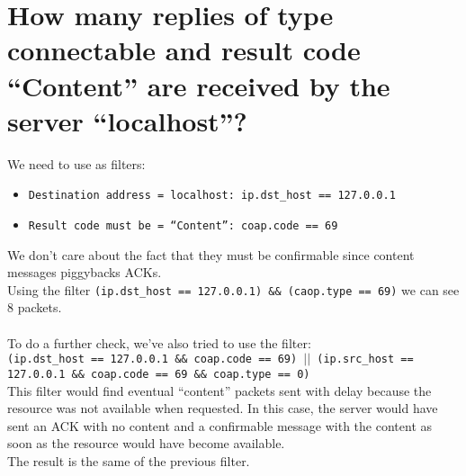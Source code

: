 \documentclass{article} %
\begin{document}
\section{\large{How many replies of type connectable and result code “Content” are received by the server “localhost”?}}
    We need to use as filters:
    \begin{itemize}
        \item \texttt{Destination address = localhost: ip.dst\_host == 127.0.0.1}
        \item \texttt{Result code must be = “Content”: coap.code == 69}
    \end{itemize}
    We don’t care about the fact that they must be confirmable since content messages piggybacks ACKs.\\
    Using the filter \texttt{(ip.dst\_host == 127.0.0.1) \&\& (caop.type == 69)} we can see 8 packets.\\ \\
    To do a further check, we’ve also tried to use the filter: \\
    \texttt{(ip.dst\_host == 127.0.0.1 \&\& coap.code == 69) $||$ (ip.src\_host == 127.0.0.1 \&\& coap.code == 69 \&\& coap.type == 0)} \\
    This filter would find eventual “content” packets sent with delay because the resource was not available when requested. 
    In this case, the server would have sent an ACK with no content and a confirmable message with the content as soon as the resource would have become available. \\
    The result is the same of the previous filter.
 
    
\end{document}
